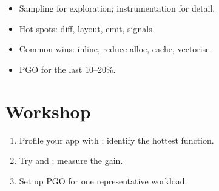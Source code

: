 \begin{recap}
\begin{itemize}[leftmargin=*]
  \item Sampling for exploration; instrumentation for
    detail.
  \item Hot spots: diff, layout, emit, signals.
  \item Common wins: inline, reduce alloc, cache, vectorise.
  \item PGO for the last 10--20\%.
\end{itemize}
\end{recap}

\section*{Workshop}

\begin{enumerate}[leftmargin=*]
  \item Profile your app with ; identify the
    hottest function.
  \item Try  and ; measure
    the gain.
  \item Set up PGO for one representative workload.
\end{enumerate}
